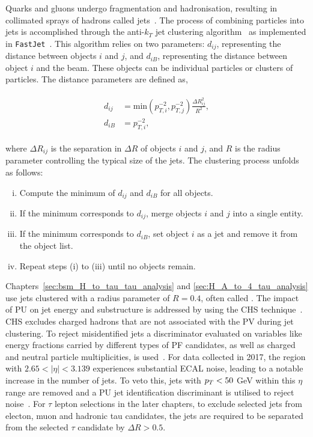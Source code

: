 Quarks and gluons undergo fragmentation and hadronisation, resulting in collimated sprays of hadrons called jets~\cite{Salam:2010nqg}. 
The process of combining particles into jets is accomplished through the anti-$k_T$ jet clustering algorithm~\cite{Cacciari:2008gp} as implemented in \texttt{FastJet}~\cite{Cacciari:2011ma}. 
This algorithm relies on two  parameters: $d_{ij}$, representing the distance between objects $i$ and $j$, and $d_{iB}$, representing the distance between object $i$ and the beam. 
These objects can be individual particles or clusters of particles. 
The distance parameters are defined as,

\begin{align}
\begin{split}
d_{ij} &= \text{min}(p_{T,i}^{-2}, p_{T,j}^{-2})  \frac{\Delta R_{ij}^{2}}{R^{2}}, \\ 
d_{iB} &= p_{T,i}^{-2}, 
\end{split}
\end{align} 
 
where $\Delta R_{ij}$ is the separation in $\Delta R$ of objects $i$ and $j$, and $R$ is the radius parameter controlling the typical size of the jets. 
The clustering process unfolds as follows:

\begin{enumerate}[i)]
\item Compute the minimum of $d_{ij}$ and $d_{iB}$ for all objects.
\item If the minimum corresponds to $d_{ij}$, merge objects $i$ and $j$ into a single entity.
\item If the minimum corresponds to $d_{iB}$, set object $i$ as a jet and remove it from the object list.
\item Repeat steps (i) to (iii) until no objects remain. 
\end{enumerate}

Chapters~\ref{sec:bsm_H_to_tau_tau_analysis} and \ref{sec:H_A_to_4_tau_analysis} use jets clustered with a radius parameter of $R = 0.4$, often called .
The impact of \ac{PU} on jet energy and substructure is addressed by using the \ac{CHS} technique~\cite{CMS:2017wyc}. 
\ac{CHS} excludes charged hadrons that are not associated with the \ac{PV} during jet clustering. 
To reject misidentified jets a discriminator evaluated on variables like energy fractions carried by different types of \ac{PF} candidates, as well as charged and neutral particle multiplicities, is used~\cite{CMS:2017wyc}. 
For data collected in 2017, the region with $2.65 < |\eta| < 3.139$ experiences substantial \ac{ECAL} noise, leading to a notable increase in the number of jets. 
To veto this, jets with $p_{T} < 50$ GeV within this $\eta$ range are removed and a \ac{PU} jet identification discriminant is utilised to reject noise~\cite{CMS:2013wea}.
For $\tau$ lepton selections in the later chapters, to exclude selected jets from electon, muon and hadronic tau candidates, the jets are required to be separated from the selected $\tau$ candidate by $\Delta R > 0.5$.

